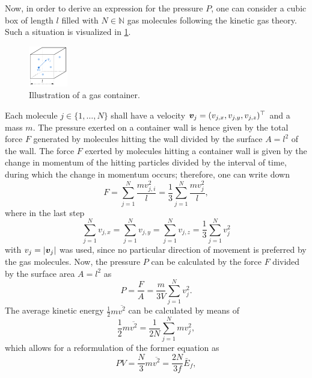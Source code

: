 \documentclass[a4paper,10pt, twocolumn]{article}
\begin{document}
Now, in order to derive an expression for the pressure $P$, one can consider a cubic box of length $l$ filled with $N \in \mathbb{N}$ gas molecules following the kinetic gas theory. Such a situation is visualized in \cref{fig:ideal-gas-law-derivation}.
\begin{figure}[h]
	\centering
	\includegraphics[width=0.15\textwidth]{figures/ideal-gas-law-derivation.pdf}
	\caption{Illustration of a gas container.}
	\label{fig:ideal-gas-law-derivation}
\end{figure} Each molecule $j \in \{1,\dots,N\}$ shall have a velocity $\bm{v}_j = (v_{j,x}, v_{j,y}, v_{j,z})^\top$ and a mass $m$. The pressure exerted on a container wall is hence given by the total force $F$ generated by molecules hitting the wall divided by the surface $A = l^2$ of the wall. The force $F$ exerted by molecules hitting a container wall is given by the change in momentum of the hitting particles divided by the interval of time, during which the change in momentum occurs; therefore, one can write down \begin{equation}
F = \sum_{j = 1}^{N}\frac{m v_{j,i}^2}{l} = \frac{1}{3}\sum_{j = 1}^{N}\frac{m v_{j}^2}{l},
\end{equation} where in the last step \begin{equation}
\sum_{j = 1}^{N}v_{j,x} = \sum_{j = 1}^{N}v_{j,y} = \sum_{j = 1}^{N}v_{j,z} = \frac{1}{3}\sum_{j = 1}^{N}v_j^2
\end{equation} with $v_j = |\bm{v}_j|$ was used, since no particular direction of movement is preferred by the gas molecules. Now, the pressure $P$ can be calculated by the force $F$ divided by the surface area $A = l^2$ as \begin{equation}
P = \frac{F}{A} = \frac{m}{3V}\sum_{j = 1}^{N} v_j^2.
\end{equation} The average kinetic energy $\frac{1}{2}m\overline{{v^2}}$ can be calculated by means of \begin{equation}
\frac{1}{2}m\overline{{v^2}} = \frac{1}{2N}\sum_{j=1}^{N} m v_j^2,
\end{equation} which allows for a reformulation of the former equation as \begin{equation}\label{eq:ideal_gas_law_almost_final}
PV = \frac{N}{3}m\overline{{v^2}} = \frac{2N}{3f}\bar{E}_f,

\end{equation}
\end{document}
